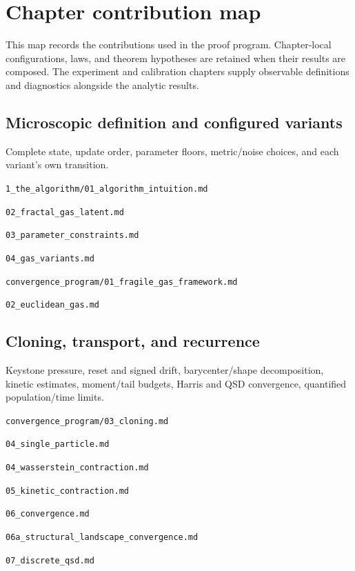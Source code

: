 \documentclass[11pt,a4paper]{article}
\begin{document}
\section{Chapter contribution map}
This map records the contributions used in the proof program. Chapter-local configurations, laws, and theorem hypotheses are retained when their results are composed. The experiment and calibration chapters supply observable definitions and diagnostics alongside the analytic results.
\par\medskip\noindent\begin{minipage}{\linewidth}
\subsection*{Microscopic definition and configured variants}
Complete state, update order, parameter floors, metric/noise choices, and each variant's own transition.

{\small\nolinkurl{1_the_algorithm/01_algorithm_intuition.md}\par}
{\small\nolinkurl{02_fractal_gas_latent.md}\par}
{\small\nolinkurl{03_parameter_constraints.md}\par}
{\small\nolinkurl{04_gas_variants.md}\par}
{\small\nolinkurl{convergence_program/01_fragile_gas_framework.md}\par}
{\small\nolinkurl{02_euclidean_gas.md}\par}
\end{minipage}\par
\par\medskip\noindent\begin{minipage}{\linewidth}
\subsection*{Cloning, transport, and recurrence}
Keystone pressure, reset and signed drift, barycenter/shape decomposition, kinetic estimates, moment/tail budgets, Harris and QSD convergence, quantified population/time limits.

{\small\nolinkurl{convergence_program/03_cloning.md}\par}
{\small\nolinkurl{04_single_particle.md}\par}
{\small\nolinkurl{04_wasserstein_contraction.md}\par}
{\small\nolinkurl{05_kinetic_contraction.md}\par}
{\small\nolinkurl{06_convergence.md}\par}
{\small\nolinkurl{06a_structural_landscape_convergence.md}\par}
{\small\nolinkurl{07_discrete_qsd.md}\par}
\end{minipage}\par
\end{document}
